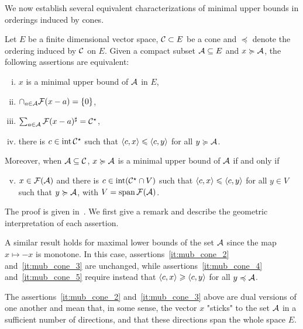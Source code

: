 \documentclass[main]{subfiles}
\begin{document}
We now establish several equivalent characterizations of minimal upper bounds in orderings induced by cones.

\begin{theorem}
\label{thm:mub_cone_char}
Let $E$ be a finite dimensional vector space,  $\mathcal{C} \subset E$ be a cone and $\preceq $ denote the ordering induced by $\mathcal{C}$ on $E$.
Given a compact subset $\mathcal{A} \subseteq E$ and $x \succcurlyeq \mathcal{A}$, the following assertions are equivalent:
\begin{enumerate}[(i)]
\item \label{it:mub_cone_1} $x$ is a minimal upper bound of $\mathcal{A}$ in $E$,
\item \label{it:mub_cone_2} $\cap_{a \in \mathcal{A}} \mathcal{F}(x-a) = \{ 0 \}$,
\item \label{it:mub_cone_3} $\sum_{a \in \mathcal{A}} \mathcal{F}(x-a) ^\sharp = \mathcal{C}^\star$,
\item \label{it:mub_cone_4} there is $c \in \operatorname{int} \mathcal{C}^\star$ such that $\langle { c } , { x } \rangle \leqslant \langle { c } , { y} \rangle$ for all $y \succcurlyeq \mathcal{A}$.
\end{enumerate}
Moreover, when $\mathcal{A} \subseteq \mathcal{C}$, $x \succcurlyeq \mathcal{A}$ is a minimal upper bound of $\mathcal{A}$ if and only if
\begin{enumerate}[(i)]
\setcounter{enumi}{4}
\item \label{it:mub_cone_5}
$x \in \mathcal{F}(\mathcal{A})$ and there is $c \in \operatorname{int} (\mathcal{C}^\star \cap V)$ such that $\langle {c} , {x} \rangle \leqslant \langle {c} , {y} \rangle$ for all $y \in V$ such that $y \succcurlyeq \mathcal{A}$,
with $V = \operatorname{span} \mathcal{F}(\mathcal{A})$.
\end{enumerate}
\end{theorem}

The proof is given  in~. We first give a remark and describe the geometric interpretation of each assertion.


\begin{remark}
\label{rem:mlb_cone}
A similar result holds for maximal lower bounds of the set $\mathcal{A}$ since the map $ x\mapsto -x$ is monotone. In this case, assertions~\eqref{it:mub_cone_2} and~\eqref{it:mub_cone_3} are unchanged, while assertions~\eqref{it:mub_cone_4} and~\eqref{it:mub_cone_5} require instead that $\langle {c} , {x} \rangle \geqslant \langle {c} , {y} \rangle$ for all $y \preccurlyeq \mathcal{A}$.
\end{remark}

The assertions~\eqref{it:mub_cone_2} and~\eqref{it:mub_cone_3} above  are dual versions of one another and mean that, in some sense, the vector $x$ "sticks" to the set $\mathcal{A}$ in a sufficient number of directions,
and that these directions span the whole space $E$.
\end{document}
